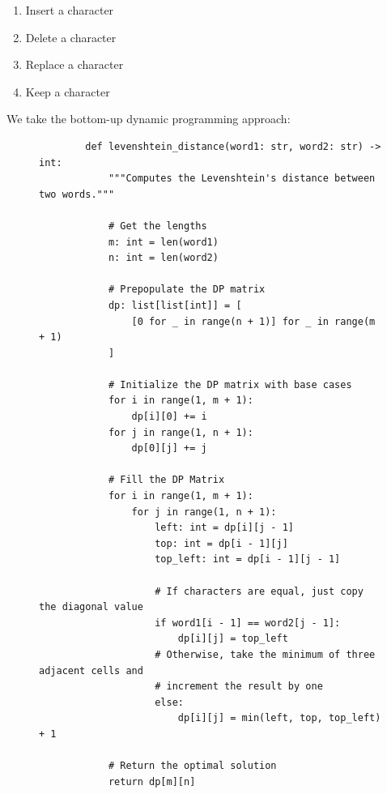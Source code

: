 \documentclass[11pt]{article}
\begin{document}
\begin{enumerate}
    \item Insert a character
    \item Delete a character
    \item Replace a character
    \item Keep a character
\end{enumerate}

We take the bottom-up dynamic programming approach:

\begin{figure}[H]
    \centering
    \begin{verbatim}
        def levenshtein_distance(word1: str, word2: str) -> int:
            """Computes the Levenshtein's distance between two words."""

            # Get the lengths
            m: int = len(word1)
            n: int = len(word2)

            # Prepopulate the DP matrix
            dp: list[list[int]] = [
                [0 for _ in range(n + 1)] for _ in range(m + 1)
            ]

            # Initialize the DP matrix with base cases
            for i in range(1, m + 1):
                dp[i][0] += i
            for j in range(1, n + 1):
                dp[0][j] += j

            # Fill the DP Matrix
            for i in range(1, m + 1):
                for j in range(1, n + 1):
                    left: int = dp[i][j - 1]
                    top: int = dp[i - 1][j]
                    top_left: int = dp[i - 1][j - 1]

                    # If characters are equal, just copy the diagonal value
                    if word1[i - 1] == word2[j - 1]:
                        dp[i][j] = top_left
                    # Otherwise, take the minimum of three adjacent cells and
                    # increment the result by one
                    else:
                        dp[i][j] = min(left, top, top_left) + 1

            # Return the optimal solution
            return dp[m][n]
    \end{verbatim}
\end{figure}


\newpage
\end{document}
